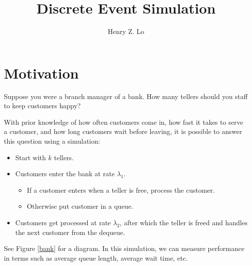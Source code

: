 \documentclass{article}
\begin{document}
\title{Discrete Event Simulation}
\author{Henry Z. Lo}
\maketitle

\section{Motivation}
Suppose you were a branch manager of a bank.  How many tellers should you staff to keep customers happy?

With prior knowledge of how often customers come in, how fast it takes to serve a customer, and how long customers wait before leaving, it is possible to answer this question using a simulation:
\begin{itemize}
\item Start with $k$ tellers.
\item Customers enter the bank at rate $\lambda_1$.
\begin{itemize}
\item If a customer enters when a teller is free, process the customer.
\item Otherwise put customer in a queue.
\end{itemize}
\item Customers get processed at rate $\lambda_2$, after which the teller is freed and handles the next customer from the dequeue.
\end{itemize}

See Figure \ref{bank} for a diagram.  In this simulation, we can measure performance in terms such as average queue length, average wait time, etc.
\end{document}
